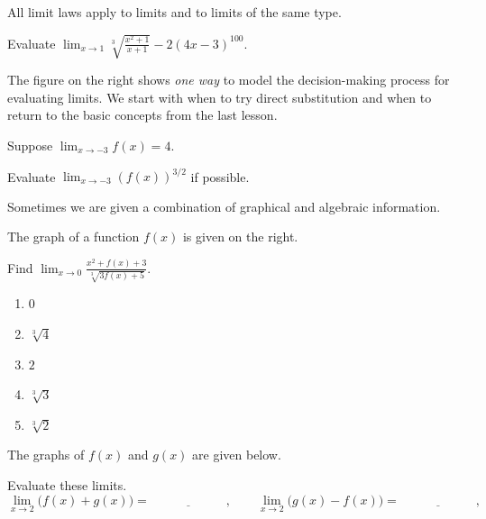 \documentclass[../main.tex]{subfiles}
\begin{document}
\faStar{} All limit laws apply to  limits and to  limits of the same type.

\begin{example}
  Evaluate \(\lim_{x \to 1} \sqrt[3]{\frac{x^{2} + 1}{x+1}} - 2 (4x - 3)^{100}\).

\end{example}
\clearpage

\begin{sidefigure}[0.40]{%
    }
  The figure on the right shows \emph{one way} to model the decision-making process for evaluating limits. We start with when to try direct substitution and when to return to the basic concepts from the last lesson.
\end{sidefigure}

\begin{example} \label{eg:limit-law-abstract}
  Suppose \(\lim_{x \to -3} f(x) = 4\).

  Evaluate \(\lim_{x \to -3} \left( f(x) \right)^{3/2}\) if possible.

\end{example}

Sometimes we are given a combination of graphical and algebraic information.

\begin{exercise} \label{ex:midterm-limit-at-continuity}
  The graph of a function \(f(x)\) is given on the right.

  \begin{sidefigure}{%
      }
    Find \(\lim_{x \to 0} \frac{x^{2} + f(x) + 3}{\sqrt[3]{3 f(x) + 5}}\).
    \begin{enumerate}[label=\Alph*.]
      \item \(0\)
      \item \(\sqrt[3]{4}\)
      \item \(2\)
      \item \(\sqrt[3]{3}\)
      \item \(\sqrt[3]{2}\)
    \end{enumerate}
  \end{sidefigure}

  \blanks*
\end{exercise}
\clearpage

\begin{example}
  The graphs of \(f(x)\) and \(g(x)\) are given below.

  \begin{center}
    
  \end{center}

  Evaluate these limits.
  \[
    \lim_{x \to 2} \Big( f(x) + g(x) \Big) = \underline{\hspace{1in}},
    \qquad
    \lim_{x \to 2} \Big( g(x) - f(x) \Big) = \underline{\hspace{1in}},
  \]

  \blanks*
\end{example}
\end{document}

